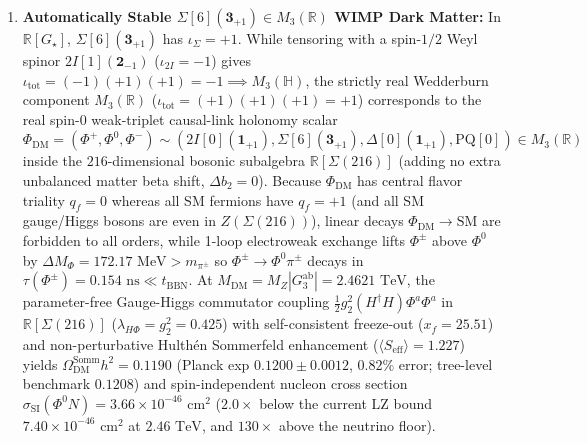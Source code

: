 \documentclass[11pt,a4paper]{article}
\theoremstyle{definition}
\theoremstyle{remark}
\newcommand{\R}{\mathbb{R}}
\newcommand{\quat}{\mathbb{H}}
\newcommand{\Gthree}{G_3}
\newcommand{\Gstar}{G_\star}
\begin{document}
\begin{enumerate}
\begin{equation}
    \end{equation}
    Furthermore, because $y_{\nu_3} = \sqrt{2}m_{\nu_3}/v_{\mathrm{ew}} = 2.89 \times 10^{-13}$, the Yukawa thermalization ratio at $T = M_Z$ is $\Gamma_{\mathrm{Yuk}}(\nu_R)/H(M_Z) = 2.59 \times 10^{-11} \ll 1$ (preventing Dirac sphaleron washout), and even UV-equilibrated $\nu_R$ decoupling at $M_{\mathrm{fl}}$ are diluted by $g_*(M_{\mathrm{fl}}) = 177.75$ to $\Delta N_{\mathrm{eff}}^{\mathrm{UV}}(\nu_R) = 3(10.75/177.75)^{4/3} = 0.0712 < 0.18$.
    \item \textbf{Automatically Stable $\Sigma[6](\mathbf{3}_{+1}) \in M_3(\R)$ WIMP Dark Matter:} In $\R[\Gstar]$, $\Sigma[6](\mathbf{3}_{+1})$ has $\iota_\Sigma = +1$. While tensoring with a spin-$1/2$ Weyl spinor $2I[1](\mathbf{2}_{-1})$ ($\iota_{2I} = -1$) gives $\iota_{\mathrm{tot}} = (-1)(+1)(+1) = -1 \implies M_3(\quat)$, the strictly real Wedderburn component $M_3(\R)$ ($\iota_{\mathrm{tot}} = (+1)(+1)(+1) = +1$) corresponds to the real spin-$0$ weak-triplet causal-link holonomy scalar $\Phi_{\mathrm{DM}} = (\Phi^+, \Phi^0, \Phi^-) \sim (2I[0](\mathbf{1}_{+1}), \Sigma[6](\mathbf{3}_{+1}), \Delta[0](\mathbf{1}_{+1}), \mathrm{PQ}[0]) \in M_3(\R)$ inside the $216$-dimensional bosonic subalgebra $\R[\Sigma(216)]$ (adding no extra unbalanced matter beta shift, $\Delta b_2 = 0$). Because $\Phi_{\mathrm{DM}}$ has central flavor triality $q_f = 0$ whereas all SM fermions have $q_f = +1$ (and all SM gauge/Higgs bosons are even in $Z(\Sigma(216))$), linear decays $\Phi_{\mathrm{DM}} \to \mathrm{SM}$ are forbidden to all orders, while 1-loop electroweak exchange lifts $\Phi^\pm$ above $\Phi^0$ by $\Delta M_\Phi = 172.17\text{ MeV} > m_{\pi^\pm}$ so $\Phi^\pm \to \Phi^0\pi^\pm$ decays in $\tau(\Phi^\pm) = 0.154\text{ ns} \ll t_{\mathrm{BBN}}$. At $M_{\mathrm{DM}} = M_Z |\Gthree^{\mathrm{ab}}| = 2.4621\text{ TeV}$, the parameter-free Gauge-Higgs commutator coupling $\frac{1}{2}g_2^2(H^\dagger H)\Phi^a\Phi^a$ in $\R[\Sigma(216)]$ ($\lambda_{H\Phi} = g_2^2 = 0.425$) with self-consistent freeze-out ($x_f = 25.51$) and non-perturbative Hulth\'en Sommerfeld enhancement ($\langle S_{\mathrm{eff}}\rangle = 1.227$) yields $\Omega_{\mathrm{DM}}^{\mathrm{Somm}} h^2 = 0.1190$ (Planck exp $0.1200 \pm 0.0012$, $0.82\%$ error; tree-level benchmark $0.1208$) and spin-independent nucleon cross section $\sigma_{\mathrm{SI}}(\Phi^0 N) = 3.66 \times 10^{-46}\text{ cm}^2$ ($2.0\times$ below the current LZ bound $7.40 \times 10^{-46}\text{ cm}^2$ at $2.46\text{ TeV}$, and $130\times$ above the neutrino floor).

\end{enumerate}
\end{document}

